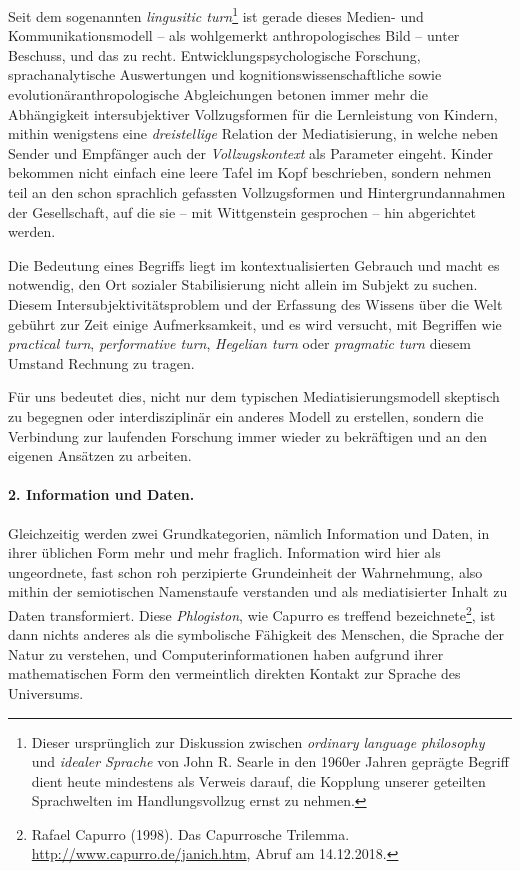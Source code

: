 \documentclass[12pt,a4paper]{article}
\begin{document}
Seit dem sogenannten \emph{lingusitic turn}\footnote{Dieser ursprünglich zur
  Diskussion zwischen \emph{ordinary language philosophy} und \emph{idealer
    Sprache} von John R. Searle in den 1960er Jahren geprägte Begriff dient
  heute mindestens als Verweis darauf, die Kopplung unserer geteilten
  Sprachwelten im Handlungsvollzug ernst zu nehmen. } ist gerade dieses
Medien- und Kommunikationsmodell -- als wohlgemerkt anthropologisches Bild --
unter Beschuss, und das zu recht.  Entwicklungspsychologische Forschung,
sprachanalytische Auswertungen und kognitionswissenschaftliche sowie
evolutionäranthropologische Abgleichungen betonen immer mehr die Abhängigkeit
intersubjektiver Vollzugsformen für die Lernleistung von Kindern, mithin
wenigstens eine \emph{dreistellige} Relation der Mediatisierung, in welche
neben Sender und Empfänger auch der \emph{Vollzugskontext} als Parameter
eingeht. Kinder bekommen nicht einfach eine leere Tafel im Kopf beschrieben,
sondern nehmen teil an den schon sprachlich gefassten Vollzugsformen und
Hintergrundannahmen der Gesellschaft, auf die sie -- mit Wittgenstein
gesprochen -- hin abgerichtet werden.

Die Bedeutung eines Begriffs liegt im kontextualisierten Gebrauch und macht es
notwendig, den Ort sozialer Stabilisierung nicht allein im Subjekt zu suchen.
Diesem Intersubjektivitätsproblem und der Erfassung des Wissens über die Welt
gebührt zur Zeit einige Aufmerksamkeit, und es wird versucht, mit Begriffen
wie \emph{practical turn}, \emph{performative turn}, \emph{Hegelian turn} oder
\emph{pragmatic turn} diesem Umstand Rechnung zu tragen.

Für uns bedeutet dies, nicht nur dem typischen Mediatisierungsmodell skeptisch
zu begegnen oder interdisziplinär ein anderes Modell zu erstellen, sondern die
Verbindung zur laufenden Forschung immer wieder zu bekräftigen und an den
eigenen Ansätzen zu arbeiten.

\paragraph{2. Information und Daten.}

Gleichzeitig werden zwei Grundkategorien, nämlich Information und Daten, in
ihrer üblichen Form mehr und mehr fraglich. Information wird hier als
ungeordnete, fast schon roh perzipierte Grundeinheit der Wahrnehmung, also
mithin der semiotischen Namenstaufe verstanden und als mediatisierter Inhalt
zu Daten transformiert. Diese \emph{Phlogiston}, wie Capurro es treffend
bezeichnete\footnote{Rafael Capurro (1998). Das Capurrosche Trilemma.
  \url{http://www.capurro.de/janich.htm}, Abruf am 14.12.2018.}, ist dann
nichts anderes als die symbolische Fähigkeit des Menschen, die Sprache der
Natur zu verstehen, und Computerinformationen haben aufgrund ihrer
mathematischen Form den vermeintlich direkten Kontakt zur Sprache des
Universums.
\end{document}
